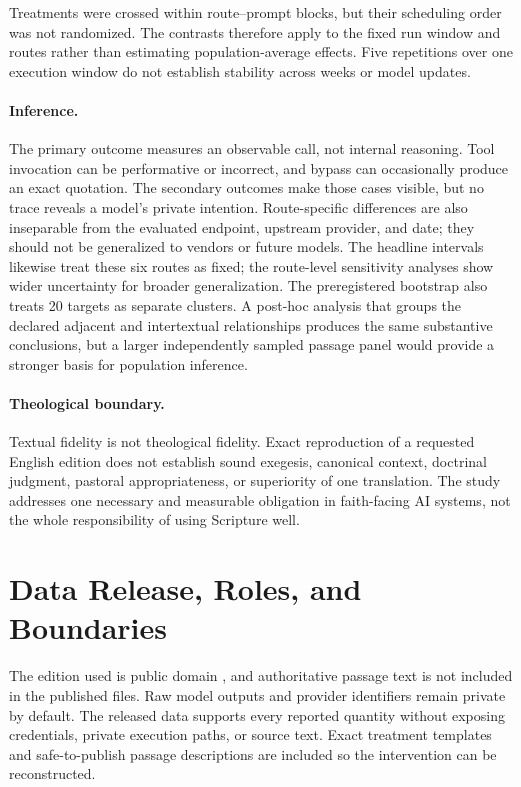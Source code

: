 \documentclass[11pt]{article}
\begin{document}
Treatments were crossed within route--prompt blocks, but their scheduling order
was not randomized. The contrasts therefore apply to the fixed run window and
routes rather than estimating population-average effects. Five repetitions over
one execution window do not establish stability across weeks or model updates.

\paragraph{Inference.}
The primary outcome measures an observable call, not internal reasoning.
Tool invocation can be performative or incorrect, and bypass can occasionally
produce an exact quotation. The secondary outcomes make those cases visible,
but no trace reveals a model's private intention. Route-specific differences
are also inseparable from the evaluated endpoint, upstream provider, and date;
they should not be generalized to vendors or future models. The headline
intervals likewise treat these six routes as fixed; the route-level sensitivity
analyses show wider uncertainty for broader generalization. The preregistered
bootstrap also treats 20 targets as separate clusters. A post-hoc analysis that
groups the declared adjacent and intertextual relationships produces the same
substantive conclusions, but a larger independently sampled passage panel would
provide a stronger basis for population inference.

\paragraph{Theological boundary.}
Textual fidelity is not theological fidelity. Exact reproduction of
a requested English edition does not establish sound exegesis, canonical
context, doctrinal judgment, pastoral appropriateness, or superiority of one
translation. The study addresses one necessary and measurable obligation in
faith-facing AI systems, not the whole responsibility of using Scripture well.

\section{Data Release, Roles, and Boundaries}
\label{sec:boundaries}

The edition used is public domain \citep{berean2023license}, and authoritative
passage text is not included in the published files. Raw model outputs and
provider identifiers remain private by default. The released data supports
every reported quantity without exposing credentials, private execution paths,
or source text. Exact treatment templates and safe-to-publish passage
descriptions are included so the intervention can be reconstructed.
\end{document}
